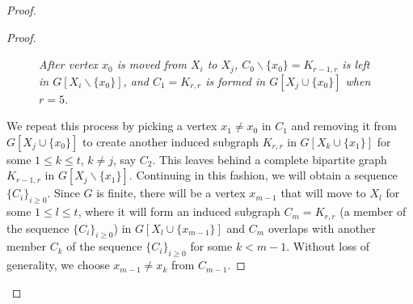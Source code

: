 \documentclass[12pt,reqno,a4paper]{amsart}
\theoremstyle{definition}
\begin{document}
\begin{proof}
\begin{enumerate}
\begin{proof}
\begin{figure}[h]
\caption{\em After vertex $x_{0}$ is moved from $X_{i}$ to $X_{j}$, $C_{0}\backslash \{x_{0}\}=K_{r-1,r}$ is left in $G[X_{i}\backslash\{x_{0}\}]$, and $C_{1}=K_{r,r}$ is formed in $G[X_{j}\cup \{x_{0}\}]$ when $r=5$.}
\label{Figure 1}
\end{figure}

We repeat this process by picking a vertex $x_{1}\neq x_{0}$ in $C_{1}$ and removing it from $G[X_{j}\cup \{x_{0}\}]$ to create another induced subgraph $K_{r,r}$ in $G[X_{k}\cup \{x_{1}\}]$ for some $1\leq k\leq t$, $k\neq j$, say $C_{2}$. This leaves behind a complete bipartite graph $K_{r-1,r}$ in $G[X_{j}\backslash \{x_{1}\}]$. 
Continuing in this fashion, we will obtain a sequence $\{C_{i}\}_{i\geq 0}$.
Since $G$ is finite, there will be a vertex $x_{m-1}$ that will move to $X_{l}$ for some $1\leq l\leq t$, where it will form an induced subgraph $C_{m}=K_{r,r}$ (a member of the sequence $\{C_{i}\}_{i\geq 0}$) in $G[X_{l}\cup \{x_{m-1}\}]$ and $C_{m}$ overlaps with another member $C_{k}$ of the sequence $\{C_{i}\}_{i\geq 0}$ for some $k<m-1$. 
Without loss of generality, we choose $x_{m-1}\neq x_{k}$ from $C_{m-1}$.


\end{proof}
\end{enumerate}
\end{proof}
\end{document}
